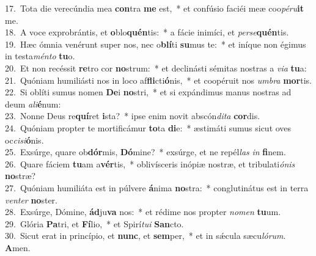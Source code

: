 {17.~}Tota die verecúndia mea \textbf{con}tra \textbf{me} est,~* et confúsio faciéi meæ coo\textit{pé}\textit{ru}\textbf{it} me.\\
{18.~}A voce exprobrántis, et \textbf{o}blo\textbf{quén}tis:~* a fácie inimíci, et \textit{per}\textit{se}\textbf{quén}tis.\\
{19.~}Hæc ómnia venérunt super nos, nec o\textbf{blí}ti \textbf{su}mus te:~* et iníque non égimus in testa\textit{mén}\textit{to} \textbf{tu}o.\\
{20.~}Et non recéssit \textbf{re}tro cor \textbf{no}strum:~* et declinásti sémitas nostras a \textit{vi}\textit{a} \textbf{tu}a:\\
{21.~}Quóniam humiliásti nos in loco af\textbf{fli}cti\textbf{ó}nis,~* et coopéruit nos \textit{um}\textit{bra} \textbf{mor}tis.\\
{22.~}Si oblíti sumus nomen \textbf{De}i \textbf{no}stri,~* et si expándimus manus nostras ad deum \textit{a}\textit{li}\textbf{é}num:\\
{23.~}Nonne Deus re\textbf{quí}ret \textbf{i}sta?~* ipse enim novit abscón\textit{di}\textit{ta} \textbf{cor}dis.\\
{24.~}Quóniam propter te mortificámur \textbf{to}ta \textbf{di}e:~* æstimáti sumus sicut oves oc\textit{ci}\textit{si}\textbf{ó}nis.\\
{25.~}Exsúrge, quare ob\textbf{dór}mis, \textbf{Dó}mine?~* exsúrge, et ne repél\textit{las} \textit{in} \textbf{fi}nem.\\
{26.~}Quare fáciem \textbf{tu}am a\textbf{vér}tis,~* oblivísceris inópiæ nostræ, et tribulati\textit{ó}\textit{nis} \textbf{no}stræ?\\
{27.~}Quóniam humiliáta est in púlvere \textbf{á}nima \textbf{no}stra:~* conglutinátus est in terra \textit{ven}\textit{ter} \textbf{no}ster.\\
{28.~}Exsúrge, Dómine, \textbf{ád}ju\textbf{va} nos:~* et rédime nos propter \textit{no}\textit{men} \textbf{tu}um.\\
{29.~}Glória \textbf{Pa}tri, et \textbf{Fí}lio,~* et Spirí\textit{tu}\textit{i} \textbf{San}cto.\\
{30.~}Sicut erat in princípio, et \textbf{nunc}, et \textbf{sem}per,~* et in sǽcula sæcu\textit{ló}\textit{rum}. \textbf{A}men.\\
